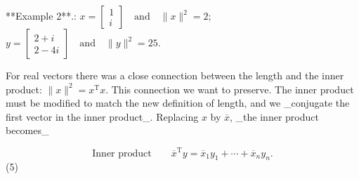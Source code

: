**Example 2**.: \(x=\begin{bmatrix}1\\ i\end{bmatrix}\quad\text{and}\quad\|x\|^{2}=2\); \(y=\begin{bmatrix}2+i\\ 2-4i\end{bmatrix}\quad\text{and}\quad\|y\|^{2}=25\).

For real vectors there was a close connection between the length and the inner product: \(\|x\|^{2}=x^{\mathrm{T}}x\). This connection we want to preserve. The inner product must be modified to match the new definition of length, and we _conjugate the first vector in the inner product_. Replacing \(x\) by \(\overline{x}\), _the inner product becomes_

\[\text{Inner product}\qquad\overline{x}^{\mathrm{T}}y=\overline{x}_{1}y_{1}+ \cdots+\overline{x}_{n}y_{n}.\] (5) 